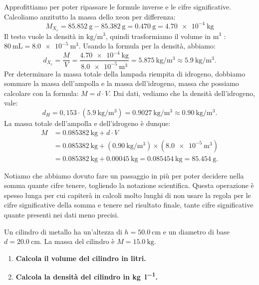 \documentclass[12pt,a4paper,oneside]{book}
\newcounter{testexample} %
\theoremstyle{esercizio}
\begin{document}
Approfittiamo per poter ripassare le formule inverse e le cifre significative. Calcoliamo anzitutto la massa dello xeon per differenza:
\[
M_{X_e} = \SI{85,852}{\gram} -\SI{85,382}{\gram}  = \SI{0,470}{\gram} =\SI{4,70e-4}{\kilo\gram}
\]
Il testo vuole la densità in $\si{\kilo\gram\per\cubic\meter}$, quindi trasformiamo il volume in $\si{\cubic\meter}$ :  $\SI{80}{\milli\liter} =\SI{8,0e-5}{\cubic\meter}$.
Usando la formula per la densità, abbiamo:
\[
d_{X_e}=\frac{M}{V} = \frac{\SI{4,70e-4}{\kilo\gram}}{\SI{8,0e-5}{\cubic\meter}}=\SI{5,875}{\kilo\gram\per\cubic\meter}      \approx  \SI{5,9}{\kilo\gram\per\cubic\meter}.  
\]
Per determinare la massa totale della lampada riempita di idrogeno, dobbiamo sommare la massa dell'ampolla e la massa dell'idrogeno, massa che possiamo calcolare con la formula: $M=d\cdot V$.
Dai dati, vediamo che la densità dell'idrogeno, vale: 
\[
d_{H} = 0,153 \cdot\left( \SI{5,9}{\kilo\gram\per\cubic\meter}\right) = \SI{0,9027}{\kilo\gram\per\cubic\meter } \approx \SI{0,90}{\kilo\gram\per\cubic\meter }.
\]
La massa totale dell'ampolla e dell'idrogeno è dunque:
\[
\begin{aligned}
    M &= \SI{0,085382}{\kilo\gram} + d \cdot V \\
      &= \SI{0,085382}{\kilo\gram} + \left(\SI{0,90}{\kilo\gram\per\cubic\meter}\right) \times \left(\SI{8,0e-5}{\cubic\meter}\right) \\
      &= \SI{0,085382}{\kilo\gram}  + \SI{0,00045}{\kilo\gram} = \SI{0,085454}{\kilo\gram} = \SI{85,454}{\gram}.
\end{aligned}
\]

Notiamo che abbiamo dovuto fare un passaggio in più per poter decidere nella somma quante cifre tenere, togliendo la notazione scientifica. Questa operazione è spesso lunga per cui capiterà in calcoli molto lunghi di non usare la regola per le cifre significative della somma e tenere nel risultato finale, tante cifre significative quante presenti nei dati meno precisi.


\begin{testexample}
Un cilindro di metallo ha un'altezza di \(h = \SI{50,0}{\centi\metre}\) e un diametro di base \(d = \SI{20,0}{\centi\metre}\). La massa del cilindro è \(M = \SI{15,0}{\kilogram}\).

\begin{enumerate}
    \item \textbf{Calcola il volume del cilindro in litri.}
    \item \textbf{Calcola la densità del cilindro in \si{\kilogram\per\litre}.}
\end{enumerate}
\end{testexample}
\end{document}
